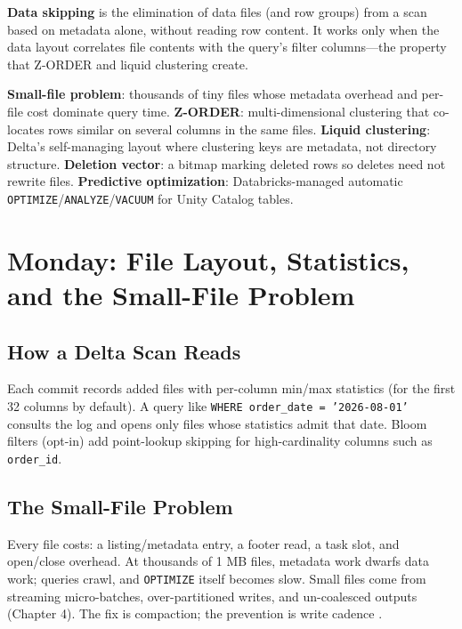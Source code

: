 \begin{definitionbox}
\textbf{Data skipping} is the elimination of data files (and row groups) from a scan based on metadata alone, without reading row content. It works only when the data layout correlates file contents with the query's filter columns---the property that Z-ORDER and liquid clustering create.
\end{definitionbox}

\begin{keyterms}
\textbf{Small-file problem}: thousands of tiny files whose metadata overhead and per-file cost dominate query time. \textbf{Z-ORDER}: multi-dimensional clustering that co-locates rows similar on several columns in the same files. \textbf{Liquid clustering}: Delta's self-managing layout where clustering keys are metadata, not directory structure. \textbf{Deletion vector}: a bitmap marking deleted rows so deletes need not rewrite files. \textbf{Predictive optimization}: Databricks-managed automatic \texttt{OPTIMIZE}/\texttt{ANALYZE}/\texttt{VACUUM} for Unity Catalog tables.
\end{keyterms}

\section{Monday: File Layout, Statistics, and the Small-File Problem}
\subsection{How a Delta Scan Reads}
Each commit records added files with per-column min/max statistics (for the first 32 columns by default). A query like \texttt{WHERE order\_date = '2026-08-01'} consults the log and opens only files whose statistics admit that date. Bloom filters (opt-in) add point-lookup skipping for high-cardinality columns such as \texttt{order\_id}.

\subsection{The Small-File Problem}
Every file costs: a listing/metadata entry, a footer read, a task slot, and open/close overhead. At thousands of 1 MB files, metadata work dwarfs data work; queries crawl, and \texttt{OPTIMIZE} itself becomes slow. Small files come from streaming micro-batches, over-partitioned writes, and un-coalesced outputs (Chapter 4). The fix is compaction; the prevention is write cadence \cite{databricksDeltaOptimize}.

